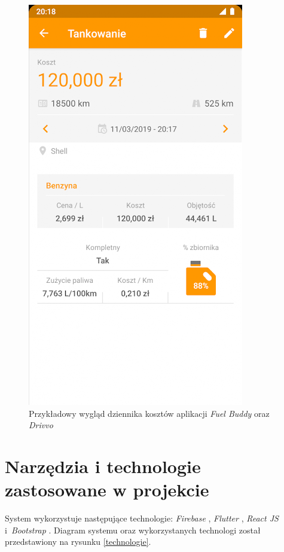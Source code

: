 \documentclass[12pt]{article}
\begin{document}
\begin{figure}
		\includegraphics[scale=0.7]{mob2.png}
	\caption{Przykładowy wygląd dziennika kosztów aplikacji \textit{Fuel Buddy} \cite{fuel} oraz \textit{Drivvo} \cite{drivvo}}
	\label{mob}
\end{figure}


 


\newpage
\section{Narzędzia i technologie zastosowane w projekcie}

System wykorzystuje następujące technologie: \textit{Firebase} \cite{firebase}, \textit{Flutter} \cite{flutter}, \textit{React JS} \cite{react} i~\textit{Bootstrap} \cite{bootstrap}. Diagram systemu oraz wykorzystanych technologi został przedstawiony na rysunku \ref{technologie}.
\end{document}
